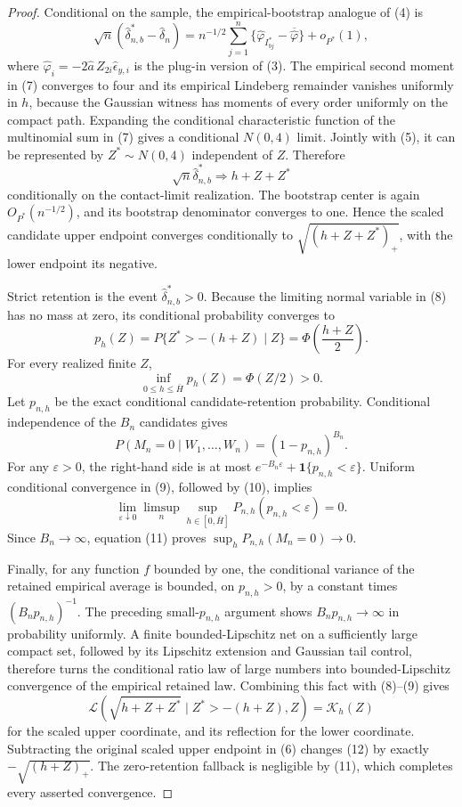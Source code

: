 \documentclass{article}
\begin{document}
\begin{proof}
Conditional on the sample, the empirical-bootstrap analogue of (4) is
\[
 \sqrt n(\widehat\delta_{n,b}^*-\widehat\delta_n)
 =n^{-1/2}\sum_{j=1}^n
 \{\widehat\varphi_{I_{bj}^*}-\overline{\widehat\varphi}\}
 +o_{P^*}(1), \tag{7}
\]
where \(\widehat\varphi_i=-2\widehat a\,Z_{2i}\widehat\epsilon_{y,i}\) is the plug-in version of (3). The empirical second moment in (7) converges to four and its empirical Lindeberg remainder vanishes uniformly in \(h\), because the Gaussian witness has moments of every order uniformly on the compact path. Expanding the conditional characteristic function of the multinomial sum in (7) gives a conditional \(N(0,4)\) limit. Jointly with (5), it can be represented by \(Z^*\sim N(0,4)\) independent of \(Z\). Therefore
\[
 \sqrt n\widehat\delta_{n,b}^*\Rightarrow h+Z+Z^* \tag{8}
\]
conditionally on the contact-limit realization. The bootstrap center is again \(O_{P^*}(n^{-1/2})\), and its bootstrap denominator converges to one. Hence the scaled candidate upper endpoint converges conditionally to \(\sqrt{(h+Z+Z^*)_+}\), with the lower endpoint its negative.

Strict retention is the event \(\widehat\delta_{n,b}^*>0\). Because the limiting normal variable in (8) has no mass at zero, its conditional probability converges to
\[
 p_h(Z)=P\{Z^*>-(h+Z)\mid Z\}
 =\Phi\!\left(\frac{h+Z}{2}\right). \tag{9}
\]
For every realized finite \(Z\),
\[
 \inf_{0\leq h\leq\bar H}p_h(Z)=\Phi(Z/2)>0. \tag{10}
\]
Let \(p_{n,h}\) be the exact conditional candidate-retention probability. Conditional independence of the \(B_n\) candidates gives
\[
 P(M_n=0\mid W_1,\ldots,W_n)=(1-p_{n,h})^{B_n}. \tag{11}
\]
For any \(\varepsilon>0\), the right-hand side is at most \(e^{-B_n\varepsilon}+\mathbf 1\{p_{n,h}<\varepsilon\}\). Uniform conditional convergence in (9), followed by (10), implies
\[
 \lim_{\varepsilon\downarrow0}\limsup_n
 \sup_{h\in[0,\bar H]}P_{n,h}(p_{n,h}<\varepsilon)=0.
\]
Since \(B_n\to\infty\), equation (11) proves \(\sup_hP_{n,h}(M_n=0)\to0\).

Finally, for any function \(f\) bounded by one, the conditional variance of the retained empirical average is bounded, on \(p_{n,h}>0\), by a constant times \((B_np_{n,h})^{-1}\). The preceding small-\(p_{n,h}\) argument shows \(B_np_{n,h}\to\infty\) in probability uniformly. A finite bounded-Lipschitz net on a sufficiently large compact set, followed by its Lipschitz extension and Gaussian tail control, therefore turns the conditional ratio law of large numbers into bounded-Lipschitz convergence of the empirical retained law. Combining this fact with (8)--(9) gives
\[
 \mathcal L\!\left(\sqrt{h+Z+Z^*}\mid
 Z^*>-(h+Z),Z\right)=\mathcal K_h(Z) \tag{12}
\]
for the scaled upper coordinate, and its reflection for the lower coordinate. Subtracting the original scaled upper endpoint in (6) changes (12) by exactly \(-\sqrt{(h+Z)_+}\). The zero-retention fallback is negligible by (11), which completes every asserted convergence.
\end{proof}
\end{document}
